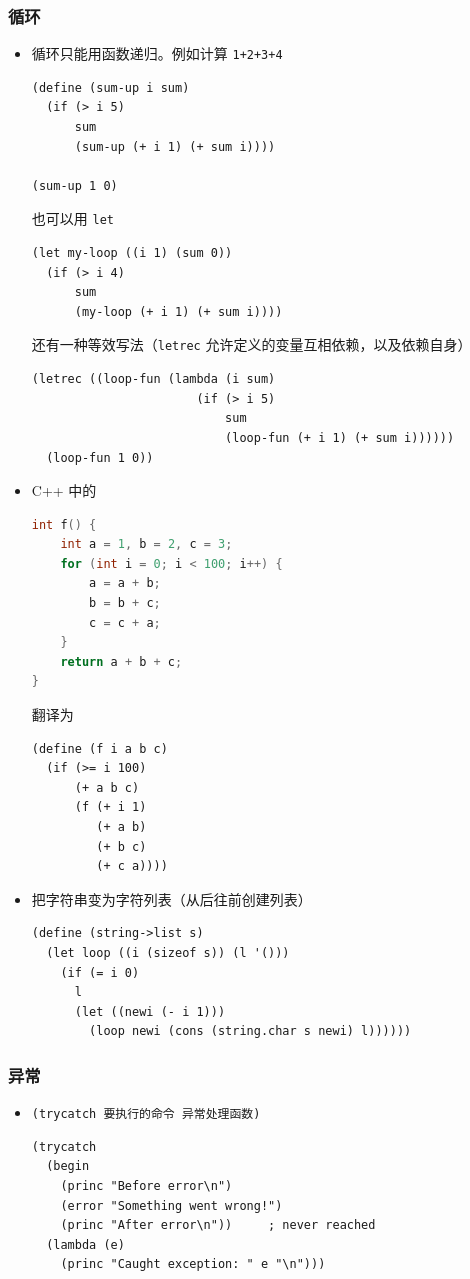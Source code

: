 \subsubsection{循环}
\begin{itemize}
\item 循环只能用函数递归。例如计算 \verb`1+2+3+4`
\begin{lstlisting}[language=none]
(define (sum-up i sum)
  (if (> i 5)
      sum
      (sum-up (+ i 1) (+ sum i))))

(sum-up 1 0)
\end{lstlisting}
也可以用 \verb`let`
\begin{lstlisting}[language=none]
(let my-loop ((i 1) (sum 0))
  (if (> i 4)
      sum
      (my-loop (+ i 1) (+ sum i))))
\end{lstlisting}
还有一种等效写法（\verb`letrec` 允许定义的变量互相依赖，以及依赖自身）
\begin{lstlisting}[language=none]
(letrec ((loop-fun (lambda (i sum)
                       (if (> i 5)
                           sum
                           (loop-fun (+ i 1) (+ sum i))))))
  (loop-fun 1 0))
\end{lstlisting}

\item C++ 中的
\begin{lstlisting}[language=cpp]
int f() {
    int a = 1, b = 2, c = 3;
    for (int i = 0; i < 100; i++) {
        a = a + b;
        b = b + c;
        c = c + a;
    }
    return a + b + c;
}
\end{lstlisting}
翻译为
\begin{lstlisting}[language=none]
(define (f i a b c)
  (if (>= i 100)
      (+ a b c)
      (f (+ i 1)
         (+ a b)
         (+ b c)
         (+ c a))))
\end{lstlisting}

\item 把字符串变为字符列表（从后往前创建列表）
\begin{lstlisting}[language=none]
(define (string->list s)
  (let loop ((i (sizeof s)) (l '()))
    (if (= i 0)
	  l
	  (let ((newi (- i 1)))
	    (loop newi (cons (string.char s newi) l))))))
\end{lstlisting}
\end{itemize}


\subsubsection{异常}
\begin{itemize}
\item \verb`(trycatch 要执行的命令 异常处理函数)`
\begin{lstlisting}[language=none]
(trycatch
  (begin
    (princ "Before error\n")
    (error "Something went wrong!")
    (princ "After error\n"))     ; never reached
  (lambda (e)
    (princ "Caught exception: " e "\n")))
\end{lstlisting}
\end{itemize}


